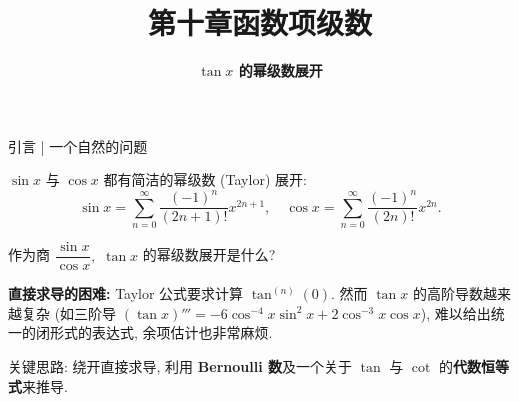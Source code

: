 \everymath{\displaystyle}



\title[数学分析]{\texorpdfstring{\LARGE \bfseries 第十章\quad 函数项级数}{第十章 函数项级数}}
\author[$\tan x$ 的幂级数展开]
{\Large \bfseries $\tan x$ 的幂级数展开}
\date{}





\begin{frame}

\titlepage

\end{frame}





\begin{frame}{引言 | 一个自然的问题}

$\sin x$ 与 $\cos x$ 都有简洁的幂级数 (Taylor) 展开:
\[
\sin x = \sum_{n=0}^\infty \frac{(-1)^n}{(2n+1)!} x^{2n+1}, \quad \cos x = \sum_{n=0}^\infty \frac{(-1)^n}{(2n)!} x^{2n}.
\]

\pause
\vspace{0.5em}

\begin{question}
作为商 $\dfrac{\sin x}{\cos x},$ $\tan x$ 的幂级数展开是什么?
\end{question}

\pause
\vspace{0.4em}

\begin{attnblock}
\textbf{直接求导的困难:} Taylor 公式要求计算 $\tan^{(n)}(0).$ 然而 $\tan x$ 的高阶导数越来越复杂 (如三阶导 $(\tan x)''' = -6 \cos^{-4} x \sin^2 x + 2 \cos^{-3} x \cos x$), 难以给出统一的闭形式的表达式, 余项估计也非常麻烦.
\end{attnblock}

\pause
\vspace{0.3em}

\alert{关键思路:} 绕开直接求导, 利用 \textbf{Bernoulli 数}及一个关于 $\tan$ 与 $\cot$ 的\textbf{代数恒等式}来推导.

\end{frame}

